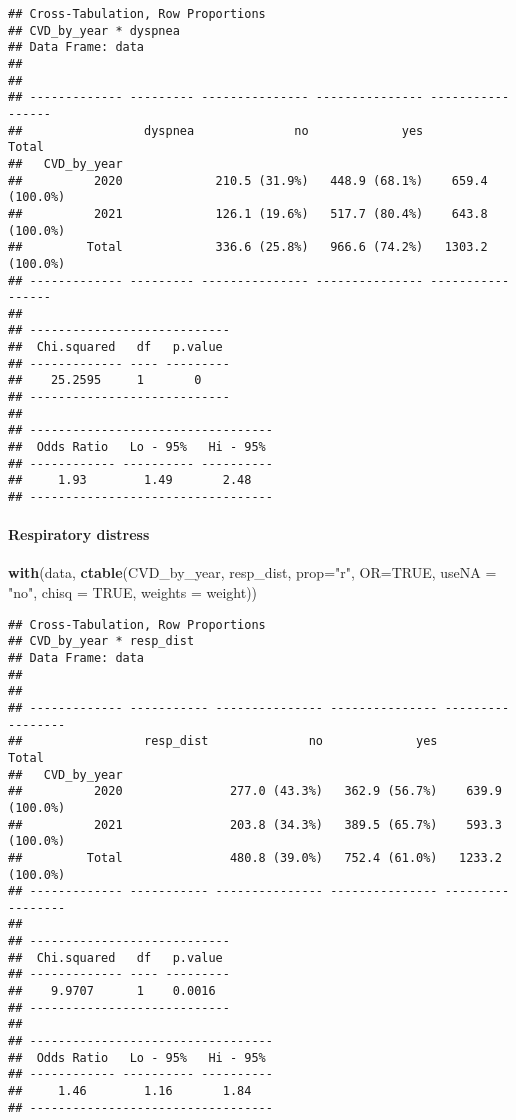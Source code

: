 \documentclass[
]{article}
\newenvironment{Shaded}{\begin{snugshade}}{\end{snugshade}}
\newcommand{\AttributeTok}[1]{\textcolor[rgb]{0.13,0.29,0.53}{#1}}
\newcommand{\ConstantTok}[1]{\textcolor[rgb]{0.56,0.35,0.01}{#1}}
\newcommand{\FunctionTok}[1]{\textcolor[rgb]{0.13,0.29,0.53}{\textbf{#1}}}
\newcommand{\NormalTok}[1]{#1}
\newcommand{\StringTok}[1]{\textcolor[rgb]{0.31,0.60,0.02}{#1}}
\begin{document}
\begin{verbatim}
## Cross-Tabulation, Row Proportions  
## CVD_by_year * dyspnea  
## Data Frame: data  
## 
## 
## ------------- --------- --------------- --------------- -----------------
##                 dyspnea              no             yes             Total
##   CVD_by_year                                                            
##          2020             210.5 (31.9%)   448.9 (68.1%)    659.4 (100.0%)
##          2021             126.1 (19.6%)   517.7 (80.4%)    643.8 (100.0%)
##         Total             336.6 (25.8%)   966.6 (74.2%)   1303.2 (100.0%)
## ------------- --------- --------------- --------------- -----------------
## 
## ----------------------------
##  Chi.squared   df   p.value 
## ------------- ---- ---------
##    25.2595     1       0    
## ----------------------------
## 
## ----------------------------------
##  Odds Ratio   Lo - 95%   Hi - 95% 
## ------------ ---------- ----------
##     1.93        1.49       2.48   
## ----------------------------------
\end{verbatim}

\hypertarget{respiratory-distress-1}{%
\paragraph{\texorpdfstring{{ Respiratory distress
}}{ Respiratory distress }}\label{respiratory-distress-1}}

\begin{Shaded}
\begin{Highlighting}[]
\FunctionTok{with}\NormalTok{(data, }\FunctionTok{ctable}\NormalTok{(CVD\_by\_year, resp\_dist, }\AttributeTok{prop=}\StringTok{"r"}\NormalTok{, }\AttributeTok{OR=}\ConstantTok{TRUE}\NormalTok{, }\AttributeTok{useNA =} \StringTok{"no"}\NormalTok{, }\AttributeTok{chisq =} \ConstantTok{TRUE}\NormalTok{, }\AttributeTok{weights =}\NormalTok{ weight))}
\end{Highlighting}
\end{Shaded}

\begin{verbatim}
## Cross-Tabulation, Row Proportions  
## CVD_by_year * resp_dist  
## Data Frame: data  
## 
## 
## ------------- ----------- --------------- --------------- -----------------
##                 resp_dist              no             yes             Total
##   CVD_by_year                                                              
##          2020               277.0 (43.3%)   362.9 (56.7%)    639.9 (100.0%)
##          2021               203.8 (34.3%)   389.5 (65.7%)    593.3 (100.0%)
##         Total               480.8 (39.0%)   752.4 (61.0%)   1233.2 (100.0%)
## ------------- ----------- --------------- --------------- -----------------
## 
## ----------------------------
##  Chi.squared   df   p.value 
## ------------- ---- ---------
##    9.9707      1    0.0016  
## ----------------------------
## 
## ----------------------------------
##  Odds Ratio   Lo - 95%   Hi - 95% 
## ------------ ---------- ----------
##     1.46        1.16       1.84   
## ----------------------------------
\end{verbatim}
\end{document}
